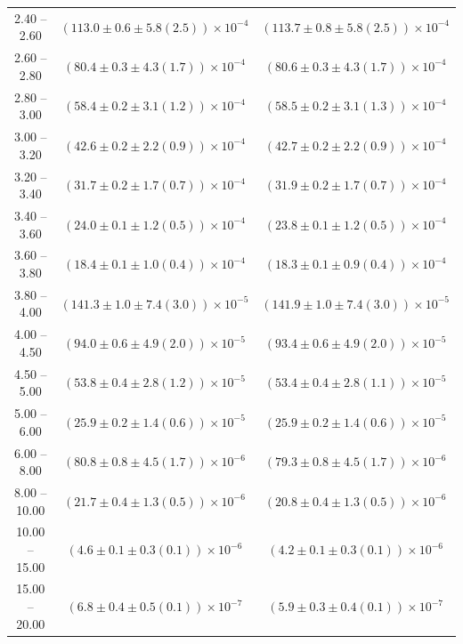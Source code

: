 \begin{table}
\begin{center}
\begin{tabular}{ c | c c }
2.40 -- 2.60 & $(113.0\pm0.6\pm5.8(2.5))\times10^{-4}$ & $(113.7\pm0.8\pm5.8(2.5))\times10^{-4}$ \\ 
2.60 -- 2.80 & $(80.4\pm0.3\pm4.3(1.7))\times10^{-4}$ & $(80.6\pm0.3\pm4.3(1.7))\times10^{-4}$ \\ 
2.80 -- 3.00 & $(58.4\pm0.2\pm3.1(1.2))\times10^{-4}$ & $(58.5\pm0.2\pm3.1(1.3))\times10^{-4}$ \\ 
3.00 -- 3.20 & $(42.6\pm0.2\pm2.2(0.9))\times10^{-4}$ & $(42.7\pm0.2\pm2.2(0.9))\times10^{-4}$ \\ 
3.20 -- 3.40 & $(31.7\pm0.2\pm1.7(0.7))\times10^{-4}$ & $(31.9\pm0.2\pm1.7(0.7))\times10^{-4}$ \\ 
3.40 -- 3.60 & $(24.0\pm0.1\pm1.2(0.5))\times10^{-4}$ & $(23.8\pm0.1\pm1.2(0.5))\times10^{-4}$ \\ 
3.60 -- 3.80 & $(18.4\pm0.1\pm1.0(0.4))\times10^{-4}$ & $(18.3\pm0.1\pm0.9(0.4))\times10^{-4}$ \\ 
3.80 -- 4.00 & $(141.3\pm1.0\pm7.4(3.0))\times10^{-5}$ & $(141.9\pm1.0\pm7.4(3.0))\times10^{-5}$ \\ 
4.00 -- 4.50 & $(94.0\pm0.6\pm4.9(2.0))\times10^{-5}$ & $(93.4\pm0.6\pm4.9(2.0))\times10^{-5}$ \\ 
4.50 -- 5.00 & $(53.8\pm0.4\pm2.8(1.2))\times10^{-5}$ & $(53.4\pm0.4\pm2.8(1.1))\times10^{-5}$ \\ 
5.00 -- 6.00 & $(25.9\pm0.2\pm1.4(0.6))\times10^{-5}$ & $(25.9\pm0.2\pm1.4(0.6))\times10^{-5}$ \\ 
6.00 -- 8.00 & $(80.8\pm0.8\pm4.5(1.7))\times10^{-6}$ & $(79.3\pm0.8\pm4.5(1.7))\times10^{-6}$ \\ 
8.00 -- 10.00 & $(21.7\pm0.4\pm1.3(0.5))\times10^{-6}$ & $(20.8\pm0.4\pm1.3(0.5))\times10^{-6}$ \\ 
10.00 -- 15.00 & $(4.6\pm0.1\pm0.3(0.1))\times10^{-6}$ & $(4.2\pm0.1\pm0.3(0.1))\times10^{-6}$ \\ 
15.00 -- 20.00 & $(6.8\pm0.4\pm0.5(0.1))\times10^{-7}$ & $(5.9\pm0.3\pm0.4(0.1))\times10^{-7}$ \\ 
\hline
\end{tabular}
\end{center}
\end{table}
 
